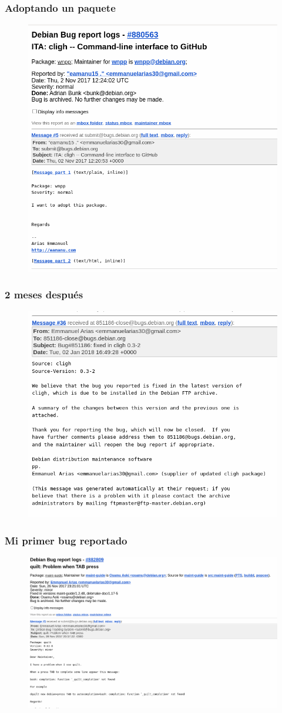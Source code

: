 \documentclass{beamer}
\begin{document}
\begin{frame}
 \frametitle{Adoptando un paquete}
    \begin{figure}
		\centering
		\includegraphics[width=0.7\linewidth]{images/ita}
		\label{fig:rfh}
	\end{figure}
\end{frame}

\begin{frame}
 \frametitle{2 meses después}
    \begin{figure}
		\centering
		\includegraphics[width=0.7\linewidth]{images/ita2}
		\label{fig:rfh}
	\end{figure}
\end{frame}

\begin{frame}
 \frametitle{Mi primer bug reportado}
    \begin{figure}
		\centering
		\includegraphics[width=0.7\linewidth]{images/bug}
		\label{fig:rfh}
	\end{figure}
\end{frame}
\end{document}
